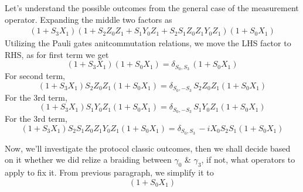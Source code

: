 \documentclass{article}
\begin{document}
\vspace{12pt}
Let's understand the possible outcomes from the general case of the measurement operator. Expanding the middle two factors as
$$
	\begin{aligned}
		(1 +S_3 X_1) (1 + S_2 Z_0 Z_1 + S_1 Y_0 Z_1 + S_2 S_1 Z_0 Z_1 Y_0 Z_1) (1 +S_0 X_1)
		\label{eq:expanding}
	\end{aligned}
$$
Utilizing the Pauli gates anitcommutation relations, we move the LHS factor to RHS,
as for first term we get
\begin{equation*}
	(1 +S_3 X_1) (1 +S_0 X_1) = \delta_{S_0,S_3}\, (1 +S_0 X_1)
\end{equation*}
For second term,
\begin{equation*}
	(1 +S_3 X_1) S_2 Z_0 Z_1 (1 +S_0 X_1) = \delta_{S_0,-S_3}\, S_2 Z_0 Z_1 (1 +S_0 X_1)
\end{equation*}
For the 3rd term,
\begin{equation*}
	(1 +S_3 X_1) S_1 Y_0 Z_1 (1 +S_0 X_1) = \delta_{S_0,-S_3}\, S_1 Y_0 Z_1 (1 +S_0 X_1)
\end{equation*}
For the 3rd term,
\begin{equation*}
	(1 +S_3 X_1) S_2 S_1 Z_0 Z_1 Y_0 Z_1 (1 +S_0 X_1) = \delta_{S_0,S_3}\, -i X_0 S_2 S_1 (1 +S_0 X_1)
\end{equation*}

Now, we'll investigate the protocol classic outcomes, then we shall decide based on it whether
we did relize a braiding between $ \gamma_0 $ \& $ \gamma_3 $, if not, what operators
to apply to fix it. From previous paragraph, we simplify it to
\begin{equation*}
	[
		\delta_{S_0,S_3} + \delta_{S_0,-S_3}\, S_2 Z_0 Z_1
		+ \delta_{S_0,-S_3}\, S_1 Y_0 Z_1 + \delta_{S_0,S_3}\, -i X_0 S_2 S_1
	] (1 +S_0 X_1)
\end{equation*}
\end{document}

